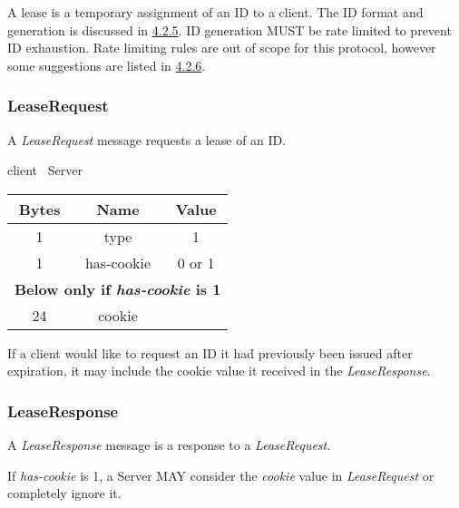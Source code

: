 \documentclass{article}
\begin{document}
    A lease is a temporary assignment of an ID to a client. The ID format and generation is discussed in
    \hyperlink{subsubsection.4.2.5}{4.2.5}. ID generation MUST be rate limited to prevent ID exhaustion. Rate
    limiting rules
    are out of scope for this protocol, however some suggestions are listed in \hyperlink{subsubsection.4.2.6}{4.2.6}.

    \subsubsection{LeaseRequest}

    A \emph{LeaseRequest} message requests a lease of an ID.

    \begin{center}
        client \textrightarrow\ Server\\
        \begin{tabular}{|c|c|c|}
            \hline
            \textbf{Bytes} & \textbf{Name} & \textbf{Value} \\
            \hline
            1              & type          & 1              \\
            \hline
            1              & has-cookie    & 0 or 1         \\
            \multicolumn{3}{|c|}{\textbf{Below only if \emph{has-cookie} is 1} } \\
            \hline
            24             & cookie        &                \\
            \hline
        \end{tabular}
    \end{center}

    If a client would like to request an ID it had previously been issued after expiration, it may include the cookie
    value it received in the \emph{LeaseResponse}.

    \subsubsection{LeaseResponse}

    A \emph{LeaseResponse} message is a response to a \emph{LeaseRequest}.

    If \emph{has-cookie} is 1, a Server MAY consider the \emph{cookie} value in \emph{LeaseRequest} or completely
    ignore it.
\end{document}
